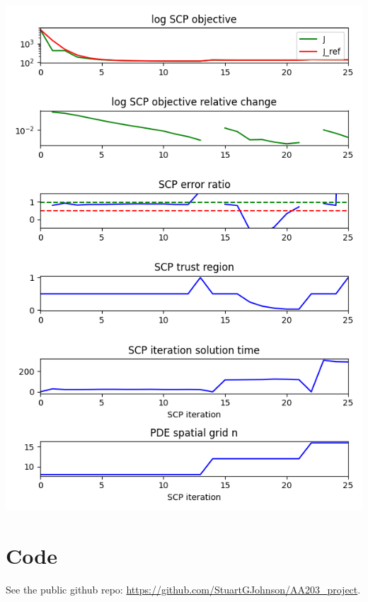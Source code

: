 \documentclass[11pt]{article}
\begin{document}
\begin{minipage}{\textwidth}
	\begin{center}
		\includegraphics[width=0.8\linewidth]{../scp_240718-012904/scp.png}
		\vspace{5pt}
	\end{center}
\end{minipage}


\section{Code}

See the public github repo: \href{https://github.com/StuartGJohnson/AA203\_project}{https://github.com/StuartGJohnson/AA203\_project}.
\end{document}
